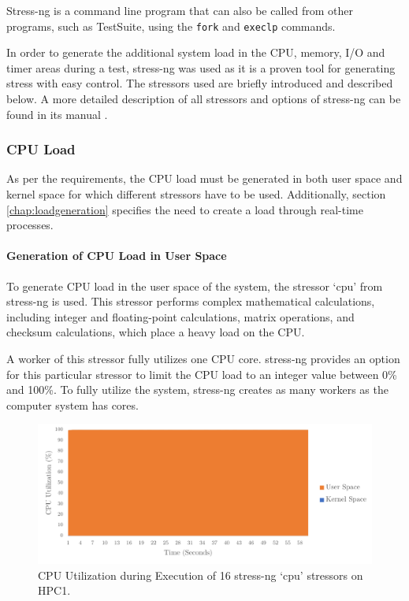 Stress-ng is a command line program that can also be called from other programs, such as TestSuite, using the \texttt{fork} \cite{stress04} and \texttt{execlp} \cite{stress05} commands.

In order to generate the additional system load in the CPU, memory, I/O and timer areas during a test, stress-ng was used as it is a proven tool for generating stress with easy control. The stressors used are briefly introduced and described below. A more detailed description of all stressors and options of stress-ng can be found in its manual \cite{stress03}.

\subsubsection{CPU Load} \label{chap:stressngCPU}
As per the requirements, the CPU load must be generated in both user space and kernel space for which different stressors have to be used. Additionally, section \ref{chap:loadgeneration} specifies the need to create a load through real-time processes.

\paragraph{Generation of CPU Load in User Space} \label{chap:CPUStressor}
To generate CPU load in the user space of the system, the stressor `cpu' from stress-ng is used. This stressor performs complex mathematical calculations, including integer and floating-point calculations, matrix operations, and checksum calculations, which place a heavy load on the CPU.

A worker of this stressor fully utilizes one CPU core. stress-ng provides an option for this particular stressor to limit the CPU load to an integer value between 0\% and 100\%. To fully utilize the system, stress-ng creates as many workers as the computer system has cores.

\begin{figure}[h!]
    \centering
    \includegraphics[width=1\linewidth]{figures/method/stress1.pdf}
    \caption{CPU Utilization during Execution of 16 stress-ng `cpu' stressors on HPC1.}
    \label{fig:stressCPU}
\end{figure}


